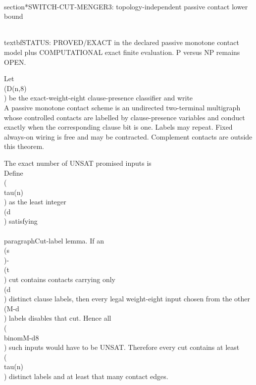 \\section*{SWITCH-CUT-MENGER3: topology-independent passive contact lower bound}

\\textbf{STATUS: PROVED/EXACT in the declared passive monotone contact model plus COMPUTATIONAL exact finite evaluation. P versus NP remains OPEN.}

Let \\(D(n,8)\\) be the exact-weight-eight clause-presence classifier and write
\\[ M=8\\binom n3. \\]
A passive monotone contact scheme is an undirected two-terminal multigraph whose controlled
contacts are labelled by clause-presence variables and conduct exactly when the corresponding
clause bit is one. Labels may repeat. Fixed always-on wiring is free and may be contracted.
Complement contacts are outside this theorem.

The exact number of UNSAT promised inputs is
\\[
U_8(n)=\\binom n3+268\\binom n4+3030\\binom n5+7800\\binom n6+5040\\binom n7.
\\]
Define \\(\\tau(n)\\) as the least integer \\(d\\) satisfying
\\[ \\binom{M-d}{8}\\le U_8(n). \\]

\\paragraph{Cut-label lemma.}
If an \\(s\\)-\\(t\\) cut contains contacts carrying only \\(d\\) distinct clause labels,
then every legal weight-eight input chosen from the other \\(M-d\\) labels disables that cut.
Hence all \\(\\binom{M-d}{8}\\) such inputs would have to be UNSAT. Therefore every cut
contains at least \\(\\tau(n)\\) distinct labels and at least that many contact edges.

